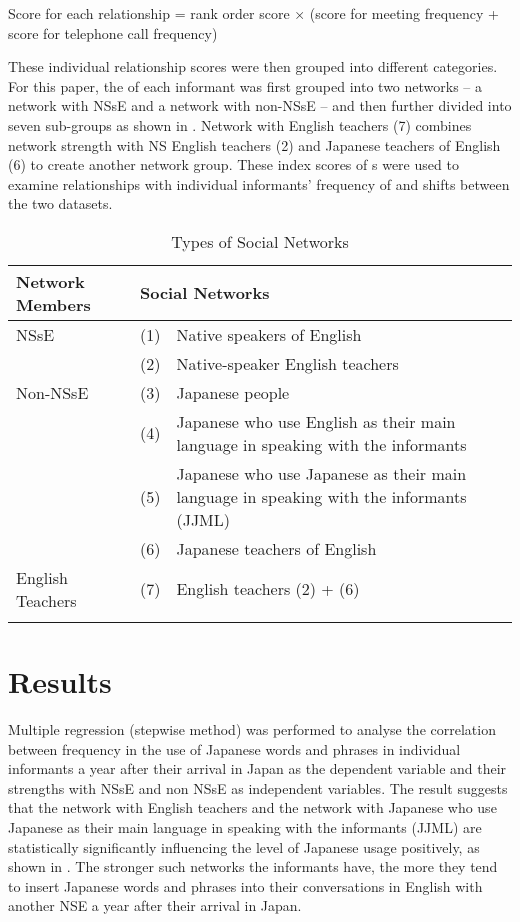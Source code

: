 \documentclass[output=paper]{LSP/langsci}
\begin{document}
Score for each relationship =   rank order score × (score for meeting frequency + score for             telephone call frequency)

These individual relationship scores were then grouped into different  categories. For this paper, the  of each informant was first grouped into two networks -- a network with NSsE and a network with non-NSsE -- and then further divided into seven sub-groups as shown in . Network with English teachers (7) combines network strength with NS English teachers (2) and Japanese teachers of English (6) to create another network group. These index scores of s were used to examine relationships with individual informants’ frequency of  and shifts between the two datasets.

\begin{table}
\begin{tabular}{lll}
\lsptoprule
Network Members & \multicolumn{2}{l}{Social Networks}\\
\midrule
NSsE & (1) & Native speakers of English\\
& (2) & Native-speaker English teachers\\
Non-NSsE & (3) & Japanese people\\
& (4) & \begin{minipage}[t]{0.6\textwidth}Japanese who use English as their main language in speaking with the informants\end{minipage}   \\
& (5) & \begin{minipage}[t]{0.6\textwidth}Japanese who use Japanese as their main language in speaking with the informants (JJML)\end{minipage}\\
& (6) & Japanese teachers of English\\
English Teachers & (7) & English teachers (2) + (6)\\
\lspbottomrule
\end{tabular}
\label{tab:1}
\caption{Types of Social Networks}
\end{table}

\section{Results}
Multiple regression (stepwise method) was performed to analyse the correlation between frequency in the use of Japanese words and phrases in individual informants a year after their arrival in Japan as the dependent variable and their  strengths with NSsE and non NSsE as independent variables. The result suggests that the network with English teachers and the network with Japanese who use Japanese as their main language in speaking with the informants (JJML) are statistically significantly influencing the level of Japanese usage positively, as shown in . The stronger such networks the informants have, the more they tend to insert Japanese words and phrases into their conversations in English with another NSE a year after their arrival in Japan. 
\end{document}

